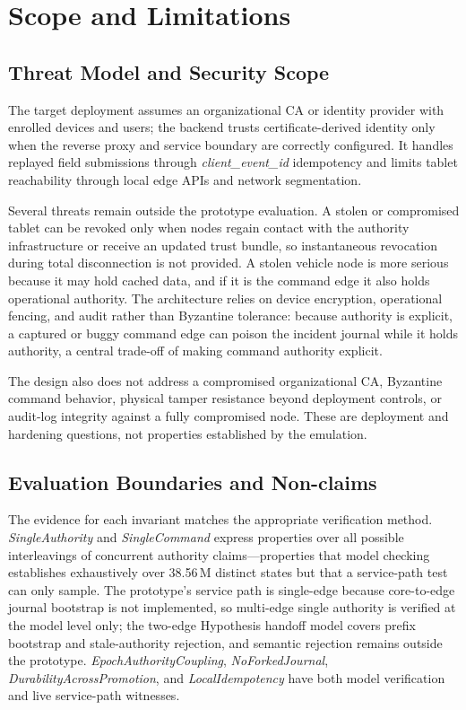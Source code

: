 \section{Scope and Limitations}
\label{sec:discussion}

\subsection{Threat Model and Security Scope}

The target deployment assumes an organizational CA or identity provider with
enrolled devices and users; the backend trusts certificate-derived identity only
when the reverse proxy and service boundary are correctly configured. It handles
replayed field submissions through \textit{client\_event\_id} idempotency and
limits tablet reachability through local edge APIs and network segmentation.

Several threats remain outside the prototype evaluation. A stolen or compromised
tablet can be revoked only when nodes regain contact with the authority
infrastructure or receive an updated trust bundle, so instantaneous revocation
during total disconnection is not provided. A stolen vehicle node is more serious
because it may hold cached data, and if it is the command edge it also holds
operational authority. The architecture relies on device encryption, operational
fencing, and audit rather than Byzantine tolerance: because authority is explicit,
a captured or buggy command edge can poison the incident journal while it holds
authority, a central trade-off of making command authority explicit.

The design also does not address a compromised organizational CA, Byzantine
command behavior, physical tamper resistance beyond deployment controls, or
audit-log integrity against a fully compromised node. These are deployment and
hardening questions, not properties established by the emulation.


\subsection{Evaluation Boundaries and Non-claims}
\label{sec:non-claims}

The evidence for each invariant matches the appropriate verification method.
\textit{SingleAuthority} and \textit{SingleCommand} express properties over all
possible interleavings of concurrent authority claims---properties that model
checking establishes exhaustively over 38.56\,M distinct states but that a
service-path test can only sample. The prototype's service path is single-edge
because core-to-edge journal bootstrap is not implemented, so multi-edge single
authority is verified at the model level only; the two-edge Hypothesis handoff
model covers prefix bootstrap and stale-authority rejection, and semantic
rejection remains outside the prototype. \textit{EpochAuthorityCoupling},
\textit{NoForkedJournal}, \textit{DurabilityAcrossPromotion}, and
\textit{LocalIdempotency} have both model verification and live service-path
witnesses.

